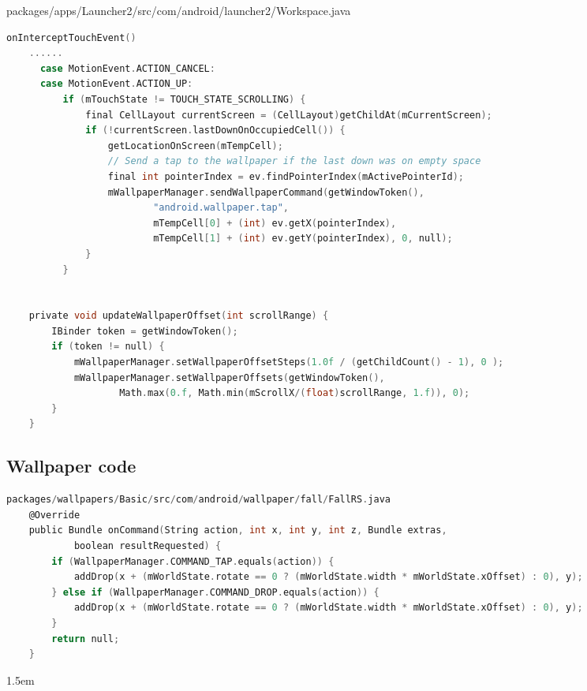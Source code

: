\documentclass[a4paper,11pt,twoside,openany]{article}%
\begin{document}
\begin{CJK}{UTF8}{song}
packages/apps/Launcher2/src/com/android/launcher2/Workspace.java
\begin{lstlisting}[language=C]
onInterceptTouchEvent()
	......
      case MotionEvent.ACTION_CANCEL:
      case MotionEvent.ACTION_UP: 
          if (mTouchState != TOUCH_STATE_SCROLLING) {
              final CellLayout currentScreen = (CellLayout)getChildAt(mCurrentScreen);
              if (!currentScreen.lastDownOnOccupiedCell()) {
                  getLocationOnScreen(mTempCell);
                  // Send a tap to the wallpaper if the last down was on empty space
                  final int pointerIndex = ev.findPointerIndex(mActivePointerId);
                  mWallpaperManager.sendWallpaperCommand(getWindowToken(), 
                          "android.wallpaper.tap",
                          mTempCell[0] + (int) ev.getX(pointerIndex),
                          mTempCell[1] + (int) ev.getY(pointerIndex), 0, null);
              }
          }


    private void updateWallpaperOffset(int scrollRange) {
        IBinder token = getWindowToken();
        if (token != null) {
            mWallpaperManager.setWallpaperOffsetSteps(1.0f / (getChildCount() - 1), 0 );
            mWallpaperManager.setWallpaperOffsets(getWindowToken(),
                    Math.max(0.f, Math.min(mScrollX/(float)scrollRange, 1.f)), 0);
        }
    }


\end{lstlisting}

\subsection{Wallpaper code }
\begin{lstlisting}[language=C]
packages/wallpapers/Basic/src/com/android/wallpaper/fall/FallRS.java
    @Override
    public Bundle onCommand(String action, int x, int y, int z, Bundle extras,
            boolean resultRequested) {
        if (WallpaperManager.COMMAND_TAP.equals(action)) {
            addDrop(x + (mWorldState.rotate == 0 ? (mWorldState.width * mWorldState.xOffset) : 0), y);
        } else if (WallpaperManager.COMMAND_DROP.equals(action)) {
            addDrop(x + (mWorldState.rotate == 0 ? (mWorldState.width * mWorldState.xOffset) : 0), y);
        }
        return null;
    }
\end{lstlisting}

\hangindent 1.5em
\noindent

\end{CJK}
\end{document}
